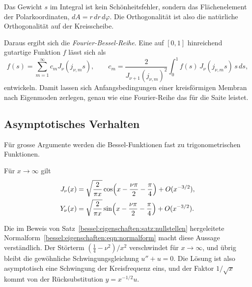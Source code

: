 Das Gewicht $s$ im Integral ist kein Schönheitsfehler, sondern das Flächenelement der Polarkoordinaten, $dA = r\,dr\,d\varphi$.
Die Orthogonalität ist also die natürliche Orthogonalität auf der Kreisscheibe.
 
Daraus ergibt sich die \emph{Fourier-Bessel-Reihe}.
%
Eine auf $[0,1]$ hinreichend gutartige Funktion $f$ lässt sich als
\begin{equation}
f(s)
=
\sum_{m=1}^{\infty}
c_m J_\nu(j_{\nu,m}s),
\qquad
c_m
=
\frac{2}{J_{\nu+1}(j_{\nu,m})^2}
\int_0^1 f(s)\,J_\nu(j_{\nu,m}s)\,s\,ds,
\label{bessel:eigenschaften:eqn:fourierbessel}
\end{equation}
entwickeln.
Damit lassen sich Anfangsbedingungen einer kreisförmigen Membran nach Eigenmoden zerlegen, genau wie eine Fourier-Reihe das für die Saite leistet.
 
%
%
\subsection{Asymptotisches Verhalten
\label{bessel:eigenschaften:subsection:asymptotik}}
Für grosse Argumente werden die Bessel-Funktionen fast zu trigonometrischen Funktionen.
 
\begin{satz}
\label{bessel:eigenschaften:satz:asymptotik}
Für $x\to\infty$ gilt
\begin{align}
J_\nu(x)
&=
\sqrt{\frac{2}{\pi x}}
\cos\Bigl(x-\frac{\nu\pi}{2}-\frac{\pi}{4}\Bigr)
+
O(x^{-3/2}),
\label{bessel:eigenschaften:eqn:asymptotikj}
\\
Y_\nu(x)
&=
\sqrt{\frac{2}{\pi x}}
\sin\Bigl(x-\frac{\nu\pi}{2}-\frac{\pi}{4}\Bigr)
+
O(x^{-3/2}).
\label{bessel:eigenschaften:eqn:asymptotiky}
\end{align}
\end{satz}

Die im Beweis von Satz~\ref{bessel:eigenschaften:satz:nullstellen} hergeleitete Normalform~\eqref{bessel:eigenschaften:eqn:normalform} macht diese Aussage verständlich.
Der Störterm $(\frac14-\nu^2)/x^2$ verschwindet für $x\to\infty$, und übrig bleibt die gewöhnliche Schwingungsgleichung $u''+u=0$.
Die Lösung ist also asymptotisch eine Schwingung der Kreisfrequenz eins, und der Faktor $1/\sqrt{x}$ kommt von der Rücksubstitution $y=x^{-1/2}u$.


